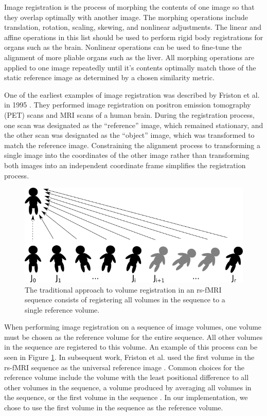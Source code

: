Image registration is the process of morphing the contents of one image so that they overlap optimally with another image. The morphing operations include translation, rotation, scaling, skewing, and nonlinear adjustments. The linear and affine operations in this list should be used to perform rigid body registrations for organs such as the brain. Nonlinear operations can be used to fine-tune the alignment of more pliable organs such as the liver. All morphing operations are applied to one image repeatedly until it's contents optimally match those of the static reference image as determined by a chosen similarity metric. 

One of the earliest examples of image registration was described by Friston et al. in 1995 \cite{Friston1995}. They performed image registration on positron emission tomography (PET) scans and MRI scans of a human brain. During the registration process, one scan was designated as the ``reference'' image, which remained stationary, and the other scan was designated as the ``object'' image, which was transformed to match the reference image. Constraining the alignment process to transforming a single image into the coordinates of the other image rather than transforming both images into an independent coordinate frame simplifies the registration process.

\begin{figure}
\centering
\includegraphics[width=.7\textwidth]{2/traditional-registration.png}
\caption{The traditional approach to volume registration in an rs-fMRI sequence consists of registering all volumes in the sequence to a single reference volume.}
\label{fig:ch4:traditional-reg}
\end{figure}

When performing image registration on a sequence of image volumes, one volume must be chosen as the reference volume for the entire sequence. All other volumes in the sequence are registered to this volume. An example of this process can be seen in Figure \ref{fig:ch4:traditional-reg}. In subsequent work, Friston et al. used the first volume in the rs-fMRI sequence as the universal reference image \cite{Friston1996}. Common choices for the reference volume include the volume with the least positional difference to all other volumes in the sequence, a volume produced by averaging all volumes in the sequence, or the first volume in the sequence \cite{Friston1996} \cite{Liao2005}. In our implementation, we chose to use the first volume in the sequence as the reference volume.

